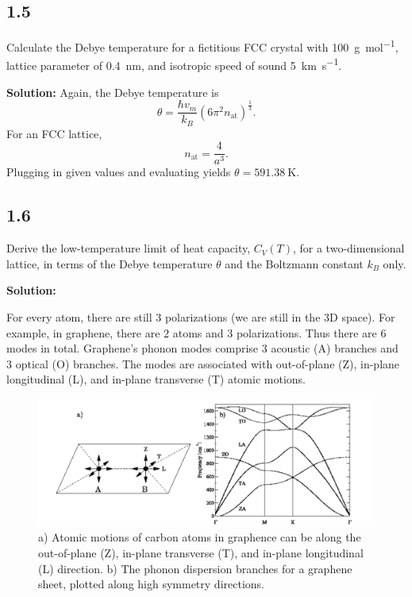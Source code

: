 \documentclass[12pt]{article}
\begin{document}
\subsection{1.5}
Calculate the Debye temperature for a fictitious FCC crystal with \SI{100}{\gram\per\mole}, lattice parameter of \SI{0.4}{\nano\meter},
and isotropic speed of sound \SI{5}{\kilo\meter\per\second}.

\textbf{Solution:}
Again, the Debye temperature is
\begin{equation}
	\theta = \frac{\hbar v_m}{k_B} (6 \pi^2 n_\text{at})^{\frac{ 1 }{ 3 }}.
\end{equation}
For an FCC lattice,
\begin{equation}
	n_\text{at} = \frac{ 4 }{ a^3 }.
\end{equation}
Plugging in given values and evaluating yields $\theta = \SI{591.38}{\kelvin}$.

\subsection{1.6}
Derive the low-temperature limit of heat capacity, $C_V(T)$,
for a two-dimensional lattice, in terms of the Debye temperature $\theta$ and the Boltzmann constant $k_B$ only.

\textbf{Solution:}

For every atom, there are still $3$ polarizations (we are still in the 3D space). For example, in graphene, there
are $2$ atoms and $3$ polarizations. Thus there are $6$ modes in total.
Graphene's phonon modes comprise $3$ acoustic (A) branches and $3$ optical (O) branches.
The modes are associated with out-of-plane (Z), in-plane longitudinal (L), and in-plane transverse (T) atomic motions.
\begin{figure}[h]
	\centering
	\includegraphics[width=0.9\linewidth]{images/graphene}
	\caption{a) Atomic motions of carbon atoms in graphence can be along the out-of-plane (Z), in-plane transverse (T), and in-plane longitudinal (L) direction. b) The phonon dispersion branches for a graphene sheet, plotted along high symmetry directions.\cite{mahdipourfath}}
	\label{fig:graphene}
\end{figure}
\end{document}

